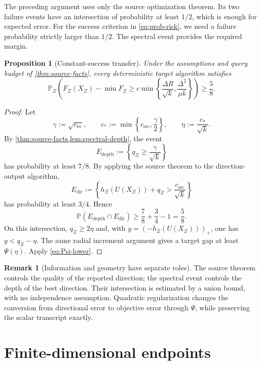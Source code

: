 \documentclass[11pt]{article}
\newcommand{\Pp}{\mathbb{P}}
\theoremstyle{plain}
\newtheorem{proposition}[proposition]{Proposition}
\theoremstyle{definition}
\newtheorem{remark}[remark]{Remark}
\begin{document}
The preceding argument uses only the source optimization theorem.
Its two failure events have an intersection of probability at least
$1/2$, which is enough for expected error. For the success criterion
in \eqref{eq:prob-risk}, we need a failure probability strictly larger
than $1/2$. The spectral event provides the required margin.

\begin{proposition}[Constant-success transfer]\label{prop:prob-transfer}
Under the assumptions and query budget of \cref{thm:source-facts}, every deterministic target algorithm satisfies
\begin{equation}\label{eq:prob-fixed-budget}
  \Pp_\Xi\left(
    F_\Xi(X_\Xi)-\min F_\Xi
    \ge c\min\left\{\frac{\Delta R}{\sqrt k},
                      \frac{\Delta^2}{\mu k}\right\}
  \right)\ge\frac58.
\end{equation}
\end{proposition}

\begin{proof}
Let
\[
  \gamma:=\sqrt{c_{\mathrm{sv}}},
  \qquad
  c_*:=\min\left\{c_{\mathrm{src}},\frac{\gamma}{2}\right\},
  \qquad
  \eta:=\frac{c_*}{\sqrt k}.
\]
By \cref{thm:source-facts,lem:spectral-depth}, the event
\[
  E_{\mathrm{depth}}:=\left\{q_\Xi\ge\frac{\gamma}{\sqrt k}\right\}
\]
has probability at least $7/8$.  By applying the source theorem to the direction-output algorithm,
\[
  E_{\mathrm{dir}}:=\left\{
     h_\Xi(U(X_\Xi))+q_\Xi>\frac{c_{\mathrm{src}}}{\sqrt k}
  \right\}
\]
has probability at least $3/4$.  Hence
\[
  \Pp(E_{\mathrm{depth}}\cap E_{\mathrm{dir}})
  \ge\frac78+\frac34-1=\frac58.
\]
On this intersection, $q_\Xi\ge2\eta$ and, with $y=(-h_\Xi(U(X_\Xi)))_+$, one has $y<q_\Xi-\eta$.  The same radial increment argument gives a target gap at least $\Psi(\eta)$.  Apply \eqref{eq:Psi-lower}.
\end{proof}

\begin{remark}[Information and geometry have separate roles]
The source theorem controls the quality of the reported direction;
the spectral event controls the depth of the best direction. Their
intersection is estimated by a union bound, with no independence
assumption. Quadratic regularization changes the conversion from
directional error to objective error through $\Psi$, while preserving
the scalar transcript exactly.
\end{remark}

\section{Finite-dimensional endpoints}\label{sec:spherical}
\end{document}
